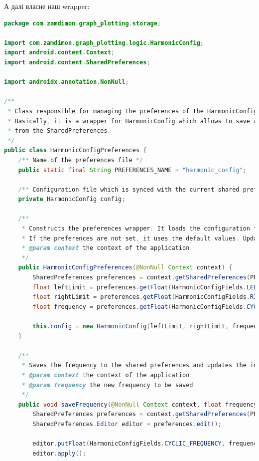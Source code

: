 \documentclass[oneside,solution]{android-assign}
\begin{document}
А далі власне наш wrapper:
\begin{lstlisting}[language=java]
package com.zamdimon.graph_plotting.storage;

import com.zamdimon.graph_plotting.logic.HarmonicConfig;
import android.content.Context;
import android.content.SharedPreferences;

import androidx.annotation.NonNull;

/**
 * Class responsible for managing the preferences of the HarmonicConfig object.
 * Basically, it is a wrapper for HarmonicConfig which allows to save and load the configuration
 * from the SharedPreferences.
 */
public class HarmonicConfigPreferences {
    /** Name of the preferences file */
    public static final String PREFERENCES_NAME = "harmonic_config";

    /** Configuration file which is synced with the current shared preferences */
    private HarmonicConfig config;

    /**
     * Constructs the preferences wrapper. It loads the configuration from the shared preferences.
     * If the preferences are not set, it uses the default values. Updates the inner HarmonicConfig.
     * @param context the context of the application
     */
    public HarmonicConfigPreferences(@NonNull Context context) {
        SharedPreferences preferences = context.getSharedPreferences(PREFERENCES_NAME, Context.MODE_PRIVATE);
        float leftLimit = preferences.getFloat(HarmonicConfigFields.LEFT_LIMIT, HarmonicConfig.MIN_LEFT_LIMIT);
        float rightLimit = preferences.getFloat(HarmonicConfigFields.RIGHT_LIMIT, HarmonicConfig.MAX_RIGHT_LIMIT);
        float frequency = preferences.getFloat(HarmonicConfigFields.CYCLIC_FREQUENCY, HarmonicConfig.DEFAULT_CYCLIC_FREQUENCY);

        this.config = new HarmonicConfig(leftLimit, rightLimit, frequency);
    }

    /**
     * Saves the frequency to the shared preferences and updates the inner configuration.
     * @param context the context of the application
     * @param frequency the new frequency to be saved
     */
    public void saveFrequency(@NonNull Context context, float frequency) {
        SharedPreferences preferences = context.getSharedPreferences(PREFERENCES_NAME, Context.MODE_PRIVATE);
        SharedPreferences.Editor editor = preferences.edit();

        editor.putFloat(HarmonicConfigFields.CYCLIC_FREQUENCY, frequency);
        editor.apply();


\end{lstlisting}
\end{document}

